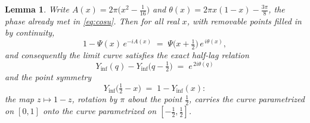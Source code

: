 \documentclass[11pt]{article}
\newtheorem{lemma}[theorem]{Lemma}
\theoremstyle{definition}
\begin{document}
\begin{lemma}\label{lem:psi-reflection}
Write $A(x)=2\pi\bigl(x^{2}-\tfrac1{16}\bigr)$ and
$\theta(x)=2\pi x(1-x)-\tfrac{3\pi}8$, the phase already met in
\eqref{eq:cosu}. Then for all real $x$, with removable points filled in by
continuity,
\begin{equation}\label{eq:psi-reflection}
1-\Psi(x)\,e^{-iA(x)}\;=\;\Psi\bigl(x+\tfrac12\bigr)\,e^{\,i\theta(x)},
\end{equation}
and consequently the limit curve satisfies the exact half-lag relation
\begin{equation}\label{eq:yinf-halflag}
Y_{\inf}(q)-Y_{\inf}\bigl(q-\tfrac12\bigr)\;=\;e^{\,2i\theta(q)}
\end{equation}
and the point symmetry
\begin{equation}\label{eq:yinf-pointsym}
Y_{\inf}\bigl(\tfrac12-x\bigr)\;=\;1-Y_{\inf}(x):
\end{equation}
the map $z\mapsto1-z$, rotation by $\pi$ about the point $\tfrac12$,
carries the curve parametrized on $[0,1]$ onto the curve parametrized on
$[-\tfrac12,\tfrac12]$.
\end{lemma}
\end{document}
